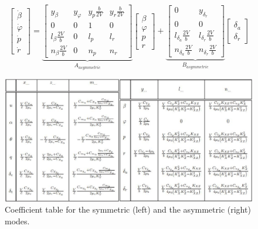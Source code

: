 \begin{equation}
\label{eq:lti_asym}
\left[ {\begin{array}{*{20}{c}}
    {\dot \beta } \\ 
    {\dot \varphi } \\ 
    {\dot p} \\ 
    {\dot r} 
\end{array}} \right] = \underbrace {\left[ {\begin{array}{*{20}{c}}
    {{y_\beta }}&{{y_\varphi }}&{{y_p}\tfrac{b}{{2V}}}&{{y_r}\tfrac{b}{{2V}}} \\ 
    0&0&1&0 \\ 
    {{l_\beta }\tfrac{{2V}}{b}}&0&{{l_p}}&{{l_r}} \\ 
    {{n_\beta }\tfrac{{2V}}{b}}&0&{{n_p}}&{{n_r}} 
\end{array}} \right]}_{{A_{asymmetric}}}\left[ {\begin{array}{*{20}{c}}
    \beta  \\ 
    \varphi  \\ 
    p \\ 
    r 
\end{array}} \right] + \underbrace {\left[ {\begin{array}{*{20}{c}}
    0&{{y_{{\delta _r}}}} \\ 
    0&0 \\ 
    {{l_{{\delta _a}}}\tfrac{{2V}}{b}}&{{l_{{\delta _r}}}\tfrac{{2V}}{b}} \\ 
    {{n_{{\delta _a}}}\tfrac{{2V}}{b}}&{{n_{{\delta _r}}}\tfrac{{2V}}{b}} 
\end{array}} \right]}_{{B_{asymmetric}}}\left[ {\begin{array}{*{20}{c}}
    {{\delta _a}} \\ 
    {{\delta _r}} 
\end{array}} \right]
\end{equation}

\begin{figure}
\centering
\includegraphics[width=14cm]{figures/tablecomplete.png}
\caption{Coefficient table for the symmetric (left) and the asymmetric (right) modes.}
\label{fig:completetable}
\end{figure}

